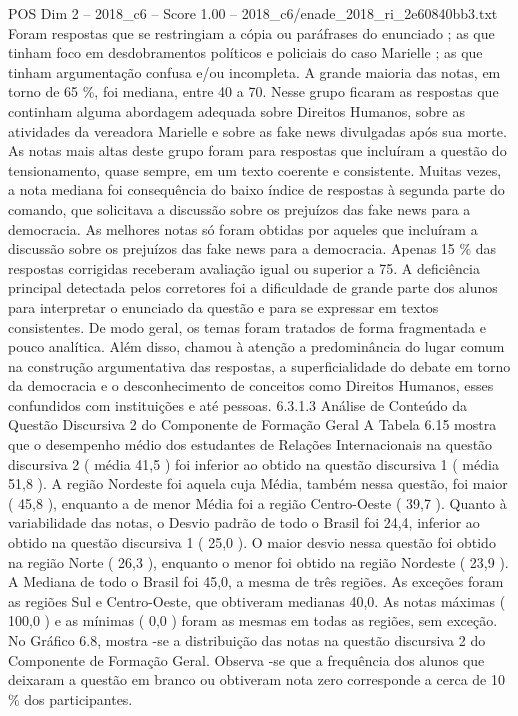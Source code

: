 \begin{textsample}{POS Dim 2 – 2018\_c6 – Score 1.00 – 2018\_c6/enade\_2018\_ri\_2e60840bb3.txt}
Foram respostas que se restringiam a cópia ou paráfrases do enunciado ; as que tinham foco em desdobramentos políticos e policiais do caso Marielle ; as que tinham argumentação confusa e/ou incompleta.
A grande maioria das notas, em torno de 65 \%, foi mediana, entre 40 a 70.
Nesse grupo ficaram as respostas que continham alguma abordagem adequada sobre Direitos Humanos, sobre as atividades da vereadora Marielle e sobre as fake news divulgadas após sua morte.
As notas mais altas deste grupo foram para respostas que incluíram a questão do tensionamento, quase sempre, em um texto coerente e consistente.
Muitas vezes, a nota mediana foi consequência do baixo índice de respostas à segunda parte do comando, que solicitava a discussão sobre os prejuízos das fake news para a democracia.
As melhores notas só foram obtidas por aqueles que incluíram a discussão sobre os prejuízos das fake news para a democracia.
Apenas 15 \% das respostas corrigidas receberam avaliação igual ou superior a 75.
A deficiência principal detectada pelos corretores foi a dificuldade de grande parte dos alunos para interpretar o enunciado da questão e para se expressar em textos consistentes.
De modo geral, os temas foram tratados de forma fragmentada e pouco analítica.
Além disso, chamou à atenção a predominância do lugar comum na construção argumentativa das respostas, a superficialidade do debate em torno da democracia e o desconhecimento de conceitos como Direitos Humanos, esses confundidos com instituições e até pessoas. 6.3.1.3 Análise de Conteúdo da Questão Discursiva 2 do Componente de Formação Geral A Tabela 6.15 mostra que o desempenho médio dos estudantes de Relações Internacionais na questão discursiva 2 ( média 41,5 ) foi inferior ao obtido na questão discursiva 1 ( média 51,8 ).
A região Nordeste foi aquela cuja Média, também nessa questão, foi maior ( 45,8 ), enquanto a de menor Média foi a região Centro-Oeste ( 39,7 ).
Quanto à variabilidade das notas, o Desvio padrão de todo o Brasil foi 24,4, inferior ao obtido na questão discursiva 1 ( 25,0 ).
O maior desvio nessa questão foi obtido na região Norte ( 26,3 ), enquanto o menor foi obtido na região Nordeste ( 23,9 ).
A Mediana de todo o Brasil foi 45,0, a mesma de três regiões.
As exceções foram as regiões Sul e Centro-Oeste, que obtiveram medianas 40,0.
As notas máximas ( 100,0 ) e as mínimas ( 0,0 ) foram as mesmas em todas as regiões, sem exceção.
No Gráfico 6.8, mostra -se a distribuição das notas na questão discursiva 2 do Componente de Formação Geral.
Observa -se que a frequência dos alunos que deixaram a questão em branco ou obtiveram nota zero corresponde a cerca de 10 \% dos participantes.

\end{textsample}
